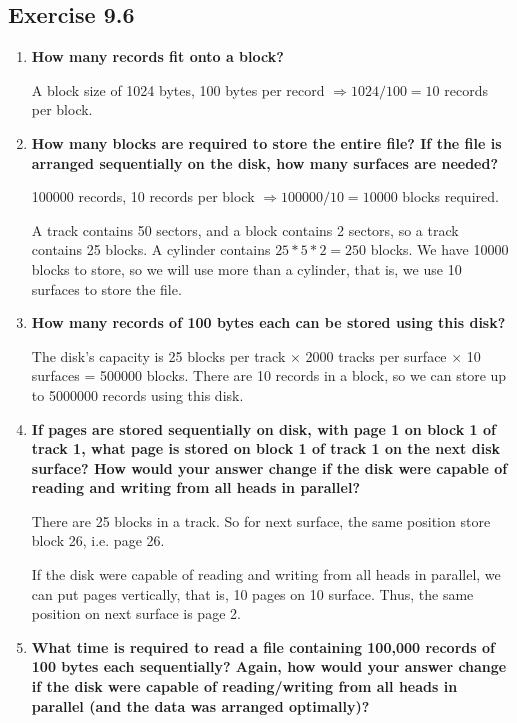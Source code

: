 \subsection{Exercise 9.6}
\begin{enumerate}
\item {\bf How many records fit onto a block?}

A block size of 1024 bytes, 100 bytes per record $\Rightarrow 1024/100 = 10$ records per block.

\item {\bf How many blocks are required to store the entire file? If the file is arranged sequentially on the disk, how many surfaces are needed?}

100000 records, 10 records per block $\Rightarrow 100000/10 = 10000$ blocks required.

A track contains 50 sectors, and a block contains 2 sectors, so a track contains 25 blocks.  A cylinder contains $25*5*2 = 250$ blocks.  We have 10000 blocks to store, so we will use more than a cylinder, that is, we use 10 surfaces to store the file.

\item {\bf How many records of 100 bytes each can be stored using this disk?}

The disk's capacity is 25 blocks per track $\times$ 2000 tracks per surface $\times$ 10 surfaces = 500000 blocks.  There are 10 records in a block, so we can store up to 5000000 records using this disk.

\item {\bf If pages are stored sequentially on disk, with page 1 on block 1 of track 1, what page is stored on block 1 of track 1 on the next disk surface? How would your answer change if the disk were capable of reading and writing from all heads in parallel?}

There are 25 blocks in a track.  So for next surface, the same position store block 26, i.e. page 26.

If the disk were capable of reading and writing from all heads in parallel, we can put pages vertically, that is, 10 pages on 10 surface.  Thus, the same position on next surface is page 2.

\item {\bf What time is required to read a file containing 100,000 records of 100 bytes each sequentially? Again, how would your answer change if the disk were capable of reading/writing from all heads in parallel (and the data was arranged optimally)?}


\end{enumerate}
